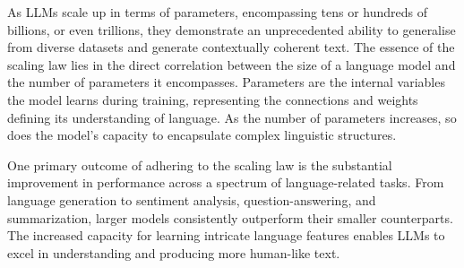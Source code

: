 As LLMs scale up in terms of parameters, encompassing tens or hundreds of billions, or even trillions, they demonstrate an unprecedented ability to generalise from diverse datasets and generate contextually coherent text.
The essence of the scaling law lies in the direct correlation between the size of a language model and the number of parameters it encompasses.
Parameters are the internal variables the model learns during training, representing the connections and weights defining its understanding of language.
As the number of parameters increases, so does the model's capacity to encapsulate complex linguistic structures.

One primary outcome of adhering to the scaling law is the substantial improvement in performance across a spectrum of language-related tasks.
From language generation to sentiment analysis, question-answering, and summarization, larger models consistently outperform their smaller counterparts.
The increased capacity for learning intricate language features enables LLMs to excel in understanding and producing more human-like text.


